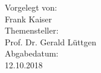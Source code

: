 \begin{titlepage}
 \vspace{2cm}
 

\large{Vorgelegt von:}\\[0.0cm]
\LARGE{Frank Kaiser}\\[0.3cm]

\large{Themensteller:}\\
\large{Prof. Dr. Gerald Lüttgen}\\[0.3cm]


\large{Abgabedatum:}\\
{\large 12.10.2018}\\[2cm] %



 

\vfill %

\end{titlepage}
